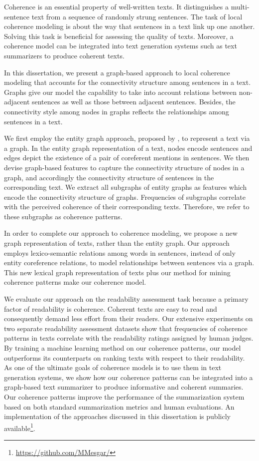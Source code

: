 \addchap*{\abstractname}

Coherence is an essential property of well-written texts. 
It distinguishes a multi-sentence text from a sequence of randomly strung sentences. 
The task of local coherence modeling is about the way that sentences in a text link up one another. 
Solving this task is beneficial for assessing the quality of texts. 
Moreover, a coherence model can be integrated into text generation systems such as text summarizers to produce coherent texts. 

In this dissertation, we present a graph-based approach to local coherence modeling that accounts for the connectivity structure among sentences in a text. 
Graphs give our model the capability to take into account relations between non-adjacent sentences as well as those between adjacent sentences. 
Besides, the connectivity style among nodes in graphs reflects the relationships among sentences in a text. 

We first employ the entity graph approach, proposed by , to represent a text via a graph. 
In the entity graph representation of a text, nodes encode sentences and edges depict the existence of a pair of coreferent mentions in sentences. 
We then devise graph-based features to capture the connectivity structure of nodes in a graph, and accordingly the connectivity structure of sentences in the corresponding text. 
We extract all subgraphs of entity graphs as features which encode the connectivity structure of graphs.    
Frequencies of subgraphs correlate with the perceived coherence of their corresponding texts. 
Therefore, we refer to these subgraphs as coherence patterns. 

In order to complete our approach to coherence modeling, we propose a new graph representation of texts, rather than the entity graph. 
Our approach employs lexico-semantic relations among words in sentences, instead of only entity coreference relations, to model relationships between sentences via a graph. 
This new lexical graph representation of texts plus our method for mining coherence patterns make our coherence model. 

We evaluate our approach on the readability assessment task because a primary factor of readability is coherence. 
Coherent texts are easy to read and consequently demand less effort from their readers. 
Our extensive experiments on two separate readability assessment datasets show that frequencies of coherence patterns in texts correlate with the readability ratings assigned by human judges. 
By training a machine learning method on our coherence patterns, our model outperforms its counterparts on ranking texts with respect to their readability. 
As one of the ultimate goals of coherence models is to use them in text generation systems, we show how our coherence patterns can be integrated into a graph-based text summarizer to produce informative and coherent summaries. 
Our coherence patterns improve the performance of the summarization system based on both standard summarization metrics and human evaluations. 
An implementation of the approaches discussed in this dissertation is publicly available\footnote{\url{https://github.com/MMesgar/}}. 

